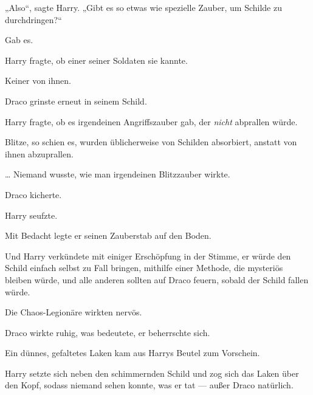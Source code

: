 „Also“, sagte Harry.
„Gibt es so etwas wie spezielle Zauber, um Schilde zu durchdringen?“

Gab es.

Harry fragte, ob einer seiner Soldaten sie kannte.

Keiner von ihnen.

Draco grinste erneut in seinem Schild.

Harry fragte, ob es irgendeinen Angriffszauber gab, der \emph{nicht} abprallen würde.

Blitze, so schien es, wurden üblicherweise von Schilden absorbiert, anstatt von ihnen abzuprallen.

… Niemand wusste, wie man irgendeinen Blitzzauber wirkte.

Draco kicherte.

Harry seufzte.

Mit Bedacht legte er seinen Zauberstab auf den Boden.

Und Harry verkündete mit einiger Erschöpfung in der Stimme, er würde den Schild einfach selbst zu Fall bringen, mithilfe einer Methode, die mysteriös bleiben würde, und alle anderen sollten auf Draco feuern, sobald der Schild fallen würde.

Die Chaos-Legionäre wirkten nervös.

Draco wirkte ruhig, was bedeutete, er beherrschte sich.

Ein dünnes, gefaltetes Laken kam aus Harrys Beutel zum Vorschein.

Harry setzte sich neben den schimmernden Schild und zog sich das Laken über den Kopf, sodass niemand sehen konnte, was er tat — außer Draco natürlich.

